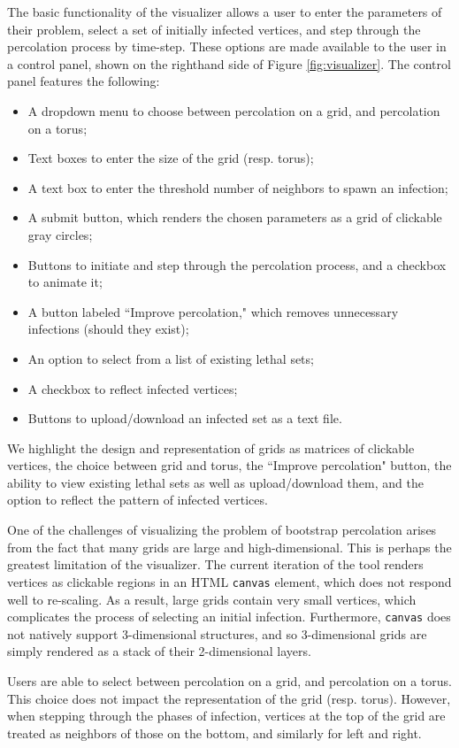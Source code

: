 The basic functionality of the visualizer allows a user to enter the parameters of their problem, select a set of initially infected vertices, and step through the percolation process by time-step. These options are made available to the user in a control panel, shown on the righthand side of Figure \ref{fig:visualizer}. The control panel features the following:
\begin{itemize}
\item A dropdown menu to choose between percolation on a grid, and percolation on a torus;
\item Text boxes to enter the size of the grid (resp. torus);
\item A text box to enter the threshold number of neighbors to spawn an infection;
\item A submit button, which renders the chosen parameters as a grid of clickable gray circles;
\item Buttons to initiate and step through the percolation process, and a checkbox to animate it;
\item A button labeled ``Improve percolation," which removes unnecessary infections (should they exist);
\item An option to select from a list of existing lethal sets;
\item A checkbox to reflect infected vertices;
\item Buttons to upload/download an infected set as a text file.
\end{itemize}
We highlight the design and representation of grids as matrices of clickable vertices, the choice between grid and torus, the ``Improve percolation" button, the ability to view existing lethal sets as well as upload/download them, and the option to reflect the pattern of infected vertices. 

One of the challenges of visualizing the problem of bootstrap percolation arises from the fact that many grids are large and high-dimensional. This is perhaps the greatest limitation of the visualizer. The current iteration of the tool renders vertices as clickable regions in an HTML \texttt{canvas} element, which does not respond well to re-scaling. As a result, large grids contain very small vertices, which complicates the process of selecting an initial infection. Furthermore, \texttt{canvas} does not natively support 3-dimensional structures, and so 3-dimensional grids are simply rendered as a stack of their 2-dimensional layers. 

Users are able to select between percolation on a grid, and percolation on a torus. This choice does not impact the representation of the grid (resp. torus). However, when stepping through the phases of infection, vertices at the top of the grid are treated as neighbors of those on the bottom, and similarly for left and right. 


